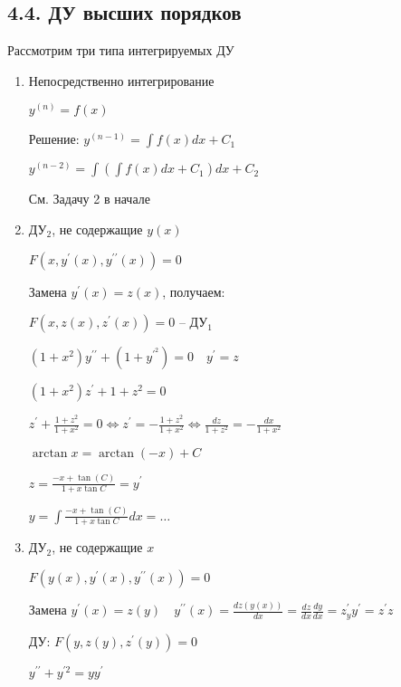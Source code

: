 \documentclass[12pt]{article}
\begin{document}
    \subsection{4.4. ДУ высших порядков}

    \hypertarget{differentilaequationshigherdegree}{}

    \Nota Рассмотрим три типа интегрируемых ДУ

    \begin{enumerate}[label*=\arabic** ]
        \item Непосредственно интегрирование

        $y^{(n)} = f(x)$

        Решение: $y^{(n - 1)} = \int f(x) dx + C_1$

        $y^{(n - 2)} = \int \left(\int f(x) dx + C_1\right) dx + C_2$

        \Ex См. Задачу 2 в начале

        \item ДУ$_2$, не содержащие $y(x)$

        $F(x, y^\prime(x), y^{\prime\prime}(x)) = 0$

        Замена $y^\prime(x) = z(x)$, получаем:

        $F(x, z(x), z^\prime(x)) = 0$ -- ДУ$_1$

        \Ex $(1 + x^2)y^{\prime\prime} + (1 + y^\prime^2) = 0 \quad y^\prime = z$

        $(1 + x^2)z^\prime + 1 + z^2 = 0$

        $z^\prime + \frac{1 + z^2}{1 + x^2} = 0 \Longleftrightarrow z^\prime = -\frac{1 + z^2}{1 + x^2} \Longleftrightarrow \frac{dz}{1 + z^2} = -\frac{dx}{1 + x^2}$

        $\arctan x = \arctan(-x) + C$

        $z = \frac{-x + \tan(C)}{1 + x \tan C} = y^\prime$

        $y = \int \frac{-x + \tan(C)}{1 + x \tan C} dx = \dots $

        \item ДУ$_2$, не содержащие $x$

        $F(y(x), y^\prime(x), y^{\prime\prime}(x)) = 0$

        Замена $y^\prime(x) = z(y) \quad y^{\prime\prime}(x) = \frac{dz(y(x))}{dx} = \frac{dz}{dx} \frac{dy}{dx} = z^\prime_y y^\prime = z^\prime z$

        ДУ: $F(y, z(y), z^\prime(y)) = 0$

        \Ex $y^{\prime\prime} + y^{\prime 2} = yy^\prime$


\end{enumerate}
\end{document}
